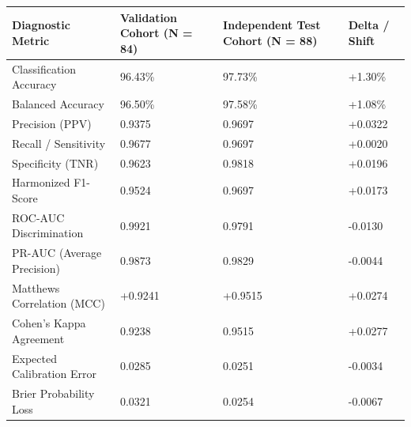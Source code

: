 \begin{tabular}{llll}
\toprule
Diagnostic Metric & Validation Cohort (N = 84) & Independent Test Cohort (N = 88) & Delta / Shift \\
\midrule
Classification Accuracy & 96.43\% & 97.73\% & +1.30\% \\
Balanced Accuracy & 96.50\% & 97.58\% & +1.08\% \\
Precision (PPV) & 0.9375 & 0.9697 & +0.0322 \\
Recall / Sensitivity & 0.9677 & 0.9697 & +0.0020 \\
Specificity (TNR) & 0.9623 & 0.9818 & +0.0196 \\
Harmonized F1-Score & 0.9524 & 0.9697 & +0.0173 \\
ROC-AUC Discrimination & 0.9921 & 0.9791 & -0.0130 \\
PR-AUC (Average Precision) & 0.9873 & 0.9829 & -0.0044 \\
Matthews Correlation (MCC) & +0.9241 & +0.9515 & +0.0274 \\
Cohen's Kappa Agreement & 0.9238 & 0.9515 & +0.0277 \\
Expected Calibration Error & 0.0285 & 0.0251 & -0.0034 \\
Brier Probability Loss & 0.0321 & 0.0254 & -0.0067 \\
\bottomrule
\end{tabular}
